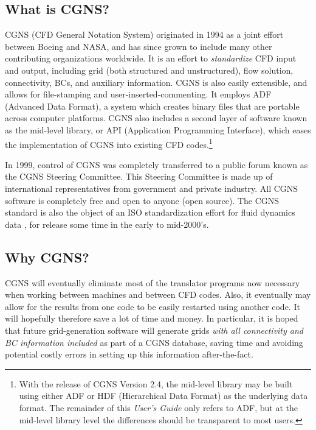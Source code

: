\documentclass[12pt]{article}
\begin{document}
\subsection{What is CGNS?}

CGNS (CFD General Notation System) originated in 1994
as a joint effort between Boeing and NASA, and has since grown
to include many other contributing organizations worldwide.
It is an effort to {\it standardize}
CFD input and output, including grid (both structured
and unstructured), flow solution,
connectivity, BCs, and auxiliary information.
CGNS is also easily extensible, and allows
for file-stamping and user-inserted-commenting.  It employs
ADF (Advanced Data Format), a system which creates binary
files that are portable across computer platforms.  CGNS also
includes a second layer of software known as the mid-level
library, or API (Application Programming Interface), which
eases the implementation of CGNS into existing CFD codes.\footnote{With
the release of CGNS Version 2.4, the mid-level library may be
built using either ADF or HDF
(Hierarchical Data Format) as the underlying data format.
The remainder of this \textit{User's Guide} only refers to ADF, but at the
mid-level library level the differences should be transparent to most
users.}


In 1999, control of CGNS was completely transferred to a public
forum known as the CGNS Steering Committee.  This Steering 
Committee is made up of international representatives from 
government and private industry.  All CGNS software
is completely free and open to anyone (open source).  The
CGNS standard is also the object of an ISO standardization 
effort for fluid dynamics data \cite{POIRIER00}, for 
release some time in the early to mid-2000's.

\subsection{Why CGNS?}

CGNS will eventually eliminate most of the translator
programs now necessary when working between machines
and between CFD codes.  Also, it eventually may allow for the
results from one code to be easily restarted using another
code.  It will hopefully therefore save a lot of time and
money.  In particular, it is hoped that future grid-generation
software will generate grids {\it with all connectivity and BC
information included} as part of a CGNS database, saving 
time and avoiding potential costly errors in setting
up this information after-the-fact.
\end{document}
